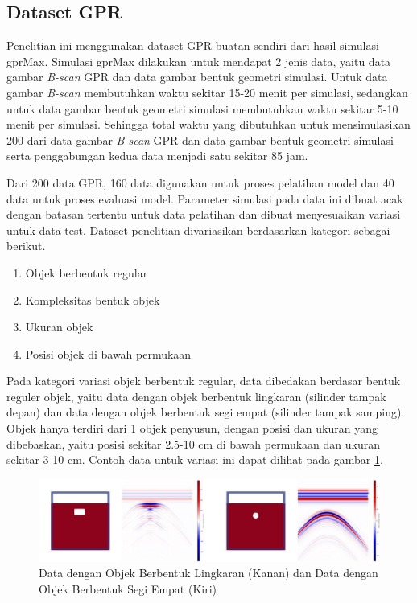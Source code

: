 \documentclass[conference]{IEEEtran}
\begin{document}
\subsection{Dataset GPR}
Penelitian ini menggunakan dataset GPR buatan sendiri dari hasil simulasi gprMax. 
Simulasi gprMax dilakukan untuk mendapat 2 jenis data, yaitu data gambar \emph{B-scan} GPR dan data gambar bentuk geometri simulasi. 
Untuk data gambar \emph{B-scan} membutuhkan waktu sekitar 15-20 menit per simulasi, sedangkan untuk data gambar bentuk geometri simulasi membutuhkan waktu sekitar 5-10 menit per simulasi. 
Sehingga total waktu yang dibutuhkan untuk mensimulasikan 200 dari data gambar \emph{B-scan} GPR dan data gambar bentuk geometri simulasi serta penggabungan kedua data menjadi satu sekitar 85 jam.

Dari 200 data GPR, 160 data digunakan untuk proses pelatihan model dan 40 data untuk proses evaluasi model. 
Parameter simulasi pada data ini dibuat acak dengan batasan tertentu untuk data pelatihan dan dibuat menyesuaikan variasi untuk data test. 
Dataset penelitian divariasikan berdasarkan kategori sebagai berikut.

\begin{enumerate}[nolistsep]

  \item Objek berbentuk regular

  \item Kompleksitas bentuk objek

  \item Ukuran objek
  
  \item Posisi objek di bawah permukaan

\end{enumerate}

Pada kategori variasi objek berbentuk regular, data dibedakan berdasar bentuk reguler objek, yaitu data dengan objek berbentuk lingkaran (silinder tampak depan) dan data dengan objek berbentuk segi empat (silinder tampak samping). 
Objek hanya terdiri dari 1 objek penyusun, dengan posisi dan ukuran yang dibebaskan, yaitu posisi sekitar 2.5-10 cm di bawah permukaan dan ukuran sekitar 3-10 cm. 
Contoh data untuk variasi ini dapat dilihat pada gambar \ref{fig:regularData}.

\begin{figure}[ht]
  \centering
  \includegraphics[scale=0.2]{gambar/variasi reguler.png}
  \caption{Data dengan Objek Berbentuk Lingkaran (Kanan) dan Data dengan Objek Berbentuk Segi Empat (Kiri)}
  \label{fig:regularData}
\end{figure}
\end{document}
